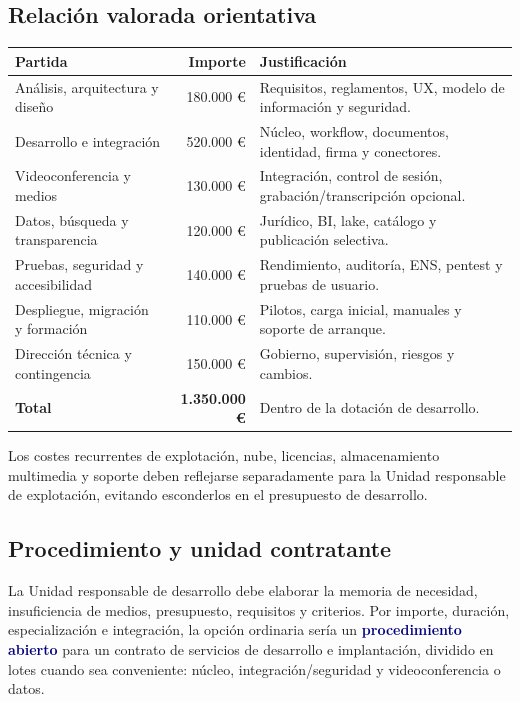 \documentclass[11pt,a4paper]{article}
\newcommand{\key}[1]{\textbf{\textcolor{navy}{#1}}}
\begin{document}
\subsection{Relación valorada orientativa}
\begin{center}
\begin{tabularx}{0.95\textwidth}{l r Y}\toprule
\textbf{Partida} & \textbf{Importe} & \textbf{Justificación}\\\midrule
Análisis, arquitectura y diseño & 180.000 € & Requisitos, reglamentos, UX, modelo de información y seguridad.\\
Desarrollo e integración & 520.000 € & Núcleo, workflow, documentos, identidad, firma y conectores.\\
Videoconferencia y medios & 130.000 € & Integración, control de sesión, grabación/transcripción opcional.\\
Datos, búsqueda y transparencia & 120.000 € & Jurídico, BI, lake, catálogo y publicación selectiva.\\
Pruebas, seguridad y accesibilidad & 140.000 € & Rendimiento, auditoría, ENS, pentest y pruebas de usuario.\\
Despliegue, migración y formación & 110.000 € & Pilotos, carga inicial, manuales y soporte de arranque.\\
Dirección técnica y contingencia & 150.000 € & Gobierno, supervisión, riesgos y cambios.\\\midrule
\textbf{Total} & \textbf{1.350.000 €} & Dentro de la dotación de desarrollo.\\\bottomrule
\end{tabularx}\end{center}

Los costes recurrentes de explotación, nube, licencias, almacenamiento multimedia y soporte deben reflejarse separadamente para la Unidad responsable de explotación, evitando esconderlos en el presupuesto de desarrollo.

\subsection{Procedimiento y unidad contratante}

La Unidad responsable de desarrollo debe elaborar la memoria de necesidad, insuficiencia de medios, presupuesto, requisitos y criterios. Por importe, duración, especialización e integración, la opción ordinaria sería un \key{procedimiento abierto} para un contrato de servicios de desarrollo e implantación, dividido en lotes cuando sea conveniente: núcleo, integración/seguridad y videoconferencia o datos.
\end{document}
